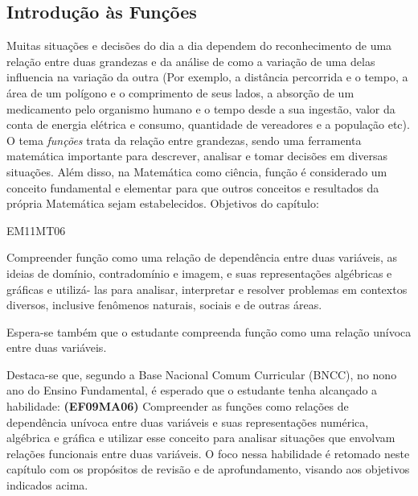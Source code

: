 \mainmatter

\begin{apresentacao}
\section{Introdução às Funções}

Muitas situações e decisões do dia a dia dependem do reconhecimento de uma relação entre duas grandezas e da análise de como a variação de uma delas influencia na variação da outra (Por exemplo, a distância percorrida e o tempo, a área de um polígono e o comprimento de seus lados, a absorção de um medicamento pelo organismo humano e o tempo desde a sua ingestão, valor da conta de energia elétrica e consumo, quantidade de vereadores e a população etc). O tema \textit{funções} trata da relação entre grandezas, sendo uma ferramenta matemática importante para descrever, analisar e tomar decisões em diversas situações. Além disso, na Matemática como ciência, função é considerado um conceito fundamental e elementar para que outros conceitos e resultados da própria Matemática sejam estabelecidos.
Objetivos do capítulo:

\begin{habilities}{EM11MT06}

Compreender função como uma relação de dependência entre duas variáveis, as ideias de domínio, contradomínio e imagem, e suas representações algébricas e gráficas e utilizá- las para analisar, interpretar e resolver problemas em contextos diversos, inclusive fenômenos naturais, sociais e de outras áreas.

Espera-se também que o estudante compreenda função como uma relação unívoca entre duas variáveis.
\end{habilities}

Destaca-se que, segundo a Base Nacional Comum Curricular (BNCC), no nono ano do Ensino Fundamental, é esperado que o estudante tenha alcançado a habilidade: \textbf{(EF09MA06)} Compreender as funções como relações de dependência unívoca entre duas variáveis e suas representações numérica, algébrica e gráfica e utilizar esse conceito para analisar situações que envolvam relações funcionais entre duas variáveis. O foco nessa habilidade é retomado neste capítulo com os propósitos de revisão e de aprofundamento, visando aos objetivos indicados acima.


\end{apresentacao}
